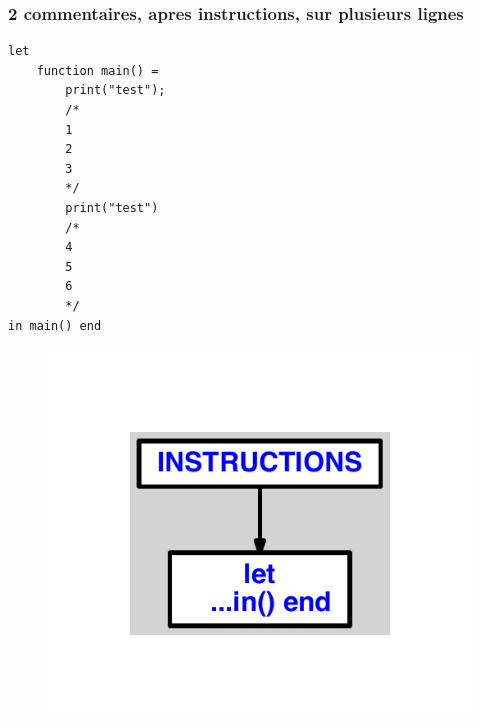 \documentclass{article}
\begin{document}
\subsubsection{2 commentaires, apres instructions, sur plusieurs lignes}
\begin{lstlisting}
let
	function main() =
		print("test");
		/*
		1
		2
		3
		*/
		print("test")
		/*
		4
		5
		6
		*/
in main() end
\end{lstlisting}
\newpage
\begin{figure}[H]
\centering
\includegraphics[max width=\textwidth]{ast/ast_157.pdf}
\end{figure}
\newpage
\end{document}
